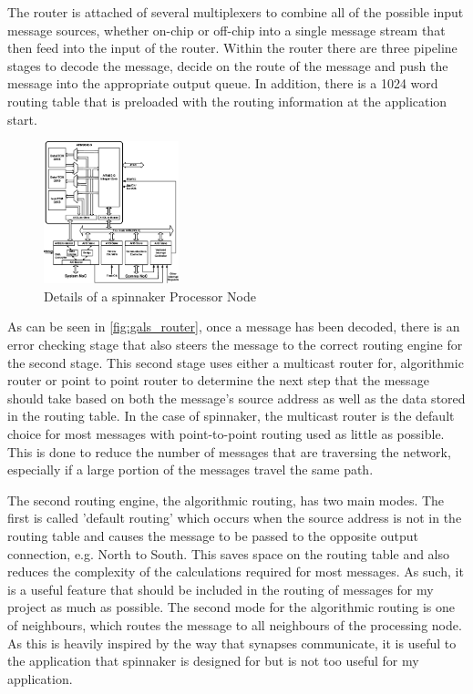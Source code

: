 \documentclass[paper=a4, fontsize=11pt, bibliography=totocnumbered]{scrartcl}
\numberwithin{equation}{section}		%
\numberwithin{figure}{section}			%
\numberwithin{table}{section}				%
\begin{document}
The router is attached of several multiplexers to combine all of the possible input \gls{message} sources, whether on-chip or off-chip into a single \gls{message} stream that then feed into the input of the router. Within the router there are three pipeline stages to decode the message, decide on the route of the \gls{message} and push the \gls{message} into the appropriate output queue. In addition, there is a 1024 word routing table that is preloaded with the routing information at the application start\cite{pub:navaridas2009understanding}.

\begin{figure}
\centering
\includegraphics[width=0.35\textwidth,keepaspectratio]{Details-of-the-SpiNNaker-processor-node.png}
\caption{Details of a \gls{spinnaker} Processor Node\cite{pub:painkras2012spinnaker}}
\label{fig:spinnaker_processor_node}
\end{figure}

As can be seen in \cref{fig:gals_router}, once a \gls{message} has been decoded, there is an error checking stage that also steers the \gls{message} to the correct routing engine for the second stage. This second stage uses either a multicast router for, algorithmic router or point to point router to determine the next step that the \gls{message} should take\cite{art:1_plana_furber_temple_khan_shi_wu_yang_2007} based on both the message's source address as well as the data stored in the routing table. In the case of \gls{spinnaker}, the multicast router is the default choice for most \glspl{message} with point-to-point routing used as little as possible\cite{pub:navaridas2009understanding}. This is done to reduce the number of \glspl{message} that are traversing the network, especially if a large portion of the \glspl{message} travel the same path.

The second routing engine, the algorithmic routing, has two main modes. The first is called 'default routing'\cite{art:1_plana_furber_temple_khan_shi_wu_yang_2007} which occurs when the source address is not in the routing table and causes the \gls{message} to be passed to the opposite output connection, e.g. North to South. This saves space on the routing table and also reduces the complexity of the calculations required for most \glspl{message}. As such, it is a useful feature that should be included in the routing of \glspl{message} for my project as much as possible. The second mode for the algorithmic routing is one of neighbours, which routes the \gls{message} to all neighbours of the processing node. As this is heavily inspired by the way that synapses communicate, it is useful to the application that \gls{spinnaker} is designed for but is not too useful for my application.
\end{document}
